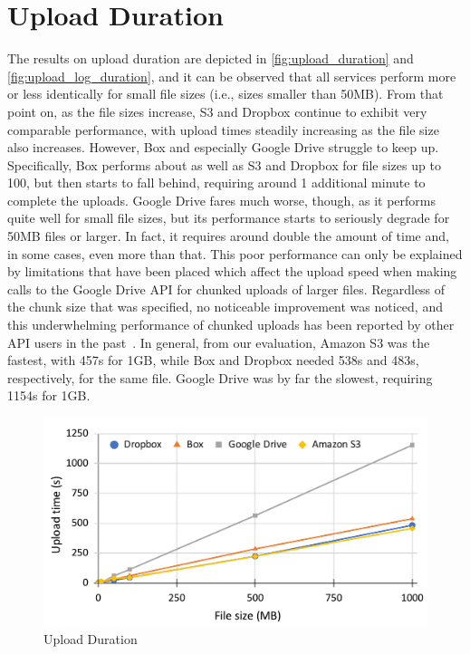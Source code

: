\section{Upload Duration}
The results on upload duration are depicted in \autoref{fig:upload_duration} and \autoref{fig:upload_log_duration}, and it can be observed that all services perform more or less identically for small file sizes (i.e., sizes smaller than 50MB). From that point on,  as the file sizes increase, S3 and Dropbox continue to exhibit very comparable performance, with upload times steadily increasing as the file size also increases.  However, Box and especially Google Drive struggle to keep up. Specifically, Box performs about as well as S3 and Dropbox for file sizes up to 100, but then starts to fall behind, requiring around 1 additional minute to complete the uploads. Google Drive fares much worse, though, as it performs quite well for small file sizes, but its performance starts to seriously degrade for 50MB files or larger. In fact, it requires around double the amount of time and, in some cases, even more than that. This poor performance can only be explained by limitations that have been placed which affect the  upload speed when making calls to the Google Drive API for chunked uploads of larger files. Regardless of the chunk size that was specified, no noticeable improvement was noticed, and this underwhelming performance of chunked uploads has been reported by other API users in the past~\cite{drive_chunked_performance}. In general, from our evaluation, Amazon S3 was the fastest, with 457s for 1GB, while Box and Dropbox needed 538s and 483s, respectively, for the same file. Google Drive was by far the slowest, requiring 1154s for 1GB.

\begin{figure} []
    \centering
    \includegraphics[scale=0.6]{images/upload_chart}
    \caption{\label{fig:upload_duration}Upload Duration}
\end{figure}

